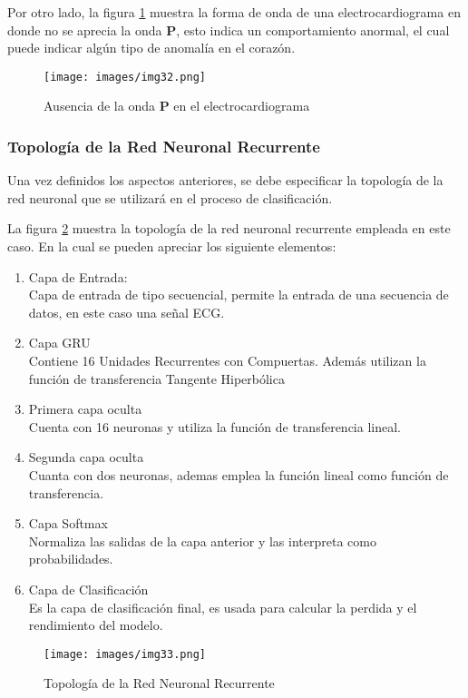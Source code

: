 Por otro lado, la figura \ref{fig:Abn_Rithm} muestra la forma de onda de una electrocardiograma en donde no se aprecia la onda \textbf{P}, esto indica un comportamiento anormal, el cual puede indicar algún tipo de anomalía en el corazón.

\begin{figure}
    \centering
    \texttt{[image: images/img32.png]}
    \caption{Ausencia de la onda \textbf{P} en el electrocardiograma}
    \label{fig:Abn_Rithm}
\end{figure}

\subsubsection{Topología de la Red Neuronal Recurrente}
Una vez definidos los aspectos anteriores, se debe especificar la topología de la red neuronal que se utilizará en el proceso de clasificación.

La figura \ref{fig:Topo} muestra la topología de la red neuronal recurrente empleada en este caso. En la cual se pueden apreciar los siguiente elementos:

\begin{enumerate}
    \item Capa de Entrada:\\
    Capa de entrada de tipo secuencial, permite la entrada de una secuencia de datos, en este caso una señal ECG.
    \item Capa GRU\\ 
    Contiene 16 Unidades Recurrentes con Compuertas. Además utilizan la función de transferencia Tangente Hiperbólica 
    \item Primera capa oculta \\
    Cuenta con 16 neuronas y utiliza la función de transferencia lineal.
    \item Segunda capa oculta\\ 
    Cuanta con dos neuronas, ademas emplea la función lineal como función de transferencia.
    \item Capa Softmax\\
    Normaliza las salidas de la capa anterior y las interpreta como probabilidades.
    \item Capa de Clasificación\\
    Es la capa de clasificación final, es usada para calcular la perdida y el rendimiento del modelo.
\end{enumerate}

\begin{figure}[!ht]
    \centering
    \texttt{[image: images/img33.png]}
    \caption{Topología de la Red Neuronal Recurrente}
    \label{fig:Topo}
\end{figure}

